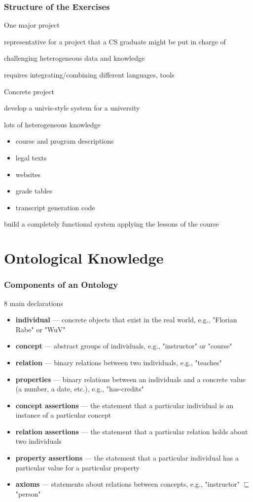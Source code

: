 \begin{frame}\frametitle{Structure of the Exercises}
\begin{blockitems}{One major project}
\item representative for a project that a CS graduate might be put in charge of
\item challenging heterogeneous data and knowledge
\item requires integrating/combining different languages, tools
\end{blockitems}

\begin{blockitems}{Concrete project}
\item develop a univis-style system for a university
\item lots of heterogeneous knowledge
 \begin{itemize}
 \item course and program descriptions
 \item legal texts
 \item websites
 \item grade tables
 \item transcript generation code
 \end{itemize} 
\item build a completely functional system applying the lessons of the course
\end{blockitems}
\end{frame}

\section{Ontological Knowledge}

\begin{frame}\frametitle{Components of an Ontology}
8 main declarations
\begin{itemize}
 \item \textbf{individual} --- concrete objects that exist in the real world, e.g., "Florian Rabe" or "WuV"
 \item \textbf{concept} --- abstract groups of individuals, e.g., "instructor" or "course"
 \item \textbf{relation} --- binary relations between two individuals, e.g., "teaches"
 \item \textbf{properties} --- binary relations between an individuals and a concrete value (a number, a date, etc.), e.g., "has-credits"
 \item \textbf{concept assertions} --- the statement that a particular individual is an instance of a particular concept
 \item \textbf{relation assertions} --- the statement that a particular relation holds about two individuals
 \item \textbf{property assertions} --- the statement that a particular individual has a particular value for a particular property
 \item \textbf{axioms} --- statements about relations between concepts, e.g., "instructor" $\sqsubseteq$ "person"
\end{itemize}
\end{frame}

